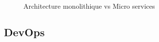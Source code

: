 \begin{figure}[H]
    \begin{center}
    \end{center}
    \caption{Architecture monolithique vs Micro services}
\end{figure}
\subsection{\selectfont\Large  DevOps}

